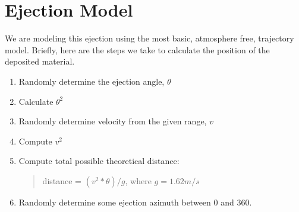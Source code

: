 \documentclass[letterpaper,10pt,english]{sphinxmanual}
\begin{document}
\section{Ejection Model}
\label{Using:ejection-model}
We are modeling this ejection using the most basic, atmosphere free, trajectory model.  Briefly, here are the steps we take to calculate the position of the deposited material.
\begin{enumerate}
\item {} 
Randomly determine the ejection angle, $\theta$

\item {} 
Calculate $\theta^2$

\item {} 
Randomly determine velocity from the given range, $v$

\item {} 
Compute $v^2$

\item {} 
Compute total possible theoretical distance:
\begin{quote}

distance = $(v^2 * \theta)/g$, where $g = 1.62m/s$
\end{quote}

\item {} 
Randomly determine some ejection azimuth between 0 and 360.

\end{enumerate}
\end{document}
